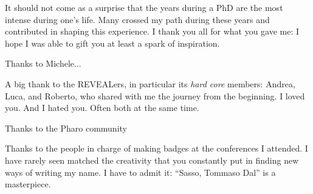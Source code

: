 
\begin{acknowledgements}

It should not come as a surprise that the years during a PhD are the most intense during one's life.
Many crossed my path during these years and contributed in shaping this experience.
I thank you all for what you gave me: I hope I was able to gift you at least a spark of inspiration.

Thanks to Michele...

A big thank to the REVEALers, in particular its \emph{hard core} members: Andrea, Luca, and Roberto, who shared with me the journey from the beginning.
I loved you. And I hated you. Often both at the same time.


Thanks to the Pharo community

Thanks to the people in charge of making badges at the conferences I attended.
I have rarely seen matched the creativity that you constantly put in finding new ways of writing my name.
I have to admit it: ``Sasso, Tommaso Dal'' is a masterpiece.


\end{acknowledgements}
